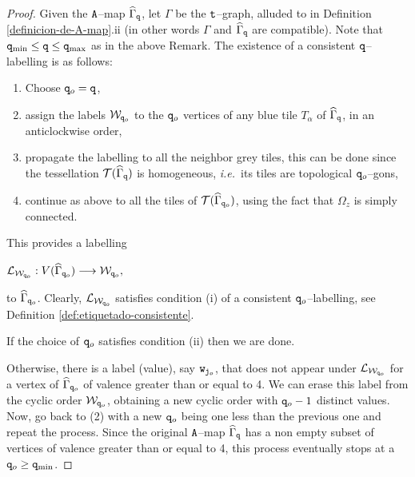 \documentclass[10pt,a4paper]{amsart}
\begin{document}
\begin{proof}
Given the $\tt A$--map $\widehat{\Gamma}_{\tt q}$, 
let $\Gamma$ be the $\tt t$--graph, alluded to in Definition \ref{definicion-de-A-map}.ii
(in other words $\Gamma$ and $\widehat{\Gamma}_{\tt q}$ are compatible).
Note that ${\tt q}_{\text{min}} \leq {\tt q} \leq {\tt q}_{\text{max}}$ as in the above Remark.
The existence of a consistent ${\tt q}$--labelling is as follows:
\begin{enumerate}[label=\arabic*),leftmargin=*]
\item Choose ${\tt q}_{\rm o} = {\tt q}$,

\item 
assign the labels $\mathcal{W}_{{\tt q}_{\rm o}}$ to the ${\tt q}_{\rm o}$ vertices of any 
blue tile $T_\alpha$ of $\widehat{\Gamma}_{\tt q}$, in an anticlockwise order,

\item
propagate the labelling to all the neighbor grey tiles, 
this can be done since
the tessellation $\mathcal{T}(\widehat{\Gamma}_{\tt q})$ is homogeneous, \emph{i.e.}\, 
its tiles are topological ${\tt q}_{\rm o}$--gons,

\item
continue as above to all the tiles of $\mathcal{T}(\widehat{\Gamma}_{{\tt q}_{\rm o}})$,
using the fact that $\Omega_z$ is simply connected.
\end{enumerate}
This provides a labelling 

\centerline{$
\mathcal{L}_{\mathcal{W}_{{\tt q}_{\rm o}}}: V(\widehat{\Gamma}_{{\tt q}_{\rm o}}) \longrightarrow \mathcal{W}_{{\tt q}_{\rm o}}, 
$}

\noindent
to $\widehat{\Gamma}_{{\tt q}_{\rm o}}$.
Clearly, $\mathcal{L}_{\mathcal{W}_{{\tt q}_{\rm o}}}$ satisfies condition (i) of a consistent ${\tt q}_{\rm o}$--labelling,
see Definition \ref{def:etiquetado-consistente}. 

\noindent
If the choice of ${\tt q}_{\rm o}$ satisfies condition (ii) then we are done.

\noindent
Otherwise, there is a label (value), say ${\tt w}_{{\tt j}_{\rm o}}$, that does not appear under 
$\mathcal{L}_{\mathcal{W}_{{\tt q}_{\rm o}}}$ for a vertex of $\widehat{\Gamma}_{{\tt q}_{\rm o}}$
of valence greater than or equal to 4. 
We can erase this label from the cyclic order $\mathcal{W}_{{\tt q}_{\rm o}}$, 
obtaining a new cyclic order with ${\tt q}_{\rm o} - 1$ distinct values.
Now, go back to (2) with a new ${\tt q}_{\rm o}$ being one less than the previous one and repeat the process.
Since the original $\tt A$--map $\widehat{\Gamma}_{\tt q}$ has a non empty subset of vertices of valence greater than or equal to 4, this process eventually stops at a ${\tt q}_{\rm o} \geq {\tt q}_{\text{min}}$.
\end{proof}
\end{document}
